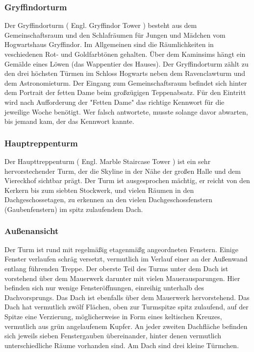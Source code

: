 \documentclass[a4paper, 10pt]{article}
\begin{document}
\subsubsection*{\large Gryffindorturm}
Der Gryffindorturm (  Engl.  Gryffindor Tower ) besteht aus dem Gemeinschaftsraum und den Schlafräumen für Jungen und Mädchen vom Hogwartshaus Gryffindor.
\vspace{10pt}
\newline
Im Allgemeinen sind die Räumlichkeiten in veschiedenen Rot- und Goldfarbtönen gehalten. Über dem Kaminsims hängt ein Gemälde eines Löwen (das Wappentier des Hauses). Der Gryffindorturm zählt zu den drei höchsten Türmen im Schloss Hogwarts neben dem Ravenclawturm und dem Astronomieturm.
\vspace{10pt}
\newline
Der Eingang zum Gemeinschaftsraum befindet sich hinter dem Portrait der fetten Dame beim großzügigen Teppenabsatz. Für den Eintritt wird nach Aufforderung der "Fetten Dame" das richtige Kennwort für die jeweilige Woche benötigt. Wer falsch antwortete, musste solange davor abwarten, bis jemand kam, der das Kennwort kannte.
\subsubsection*{\large Hauptreppenturm}
Der Haupttreppenturm (  Engl.  Marble Staircase Tower ) ist ein sehr hervorstechender Turm, der die Skyline in der Nähe der großen Halle und dem Viereckhof sichtbar prägt. Der Turm ist ausgesprochen mächtig, er reicht von den Kerkern bis zum siebten Stockwerk, und vielen Räumen in den Dachgeschossetagen, zu erkennen an den vielen Dachgeschossfenstern (Gaubenfenstern) im spitz zulaufendem Dach.
\subsubsection*{\large Außenansicht}
Der Turm ist rund mit regelmäßig etagenmäßg angeordneten Fenstern. Einige Fenster verlaufen schräg versetzt, vermutlich im Verlauf einer an der Außenwand entlang führenden Treppe. Der oberste Teil des Turms unter dem Dach ist vorstehend über dem Mauerwerk darunter mit vielen Mauerausparungen. Hier befinden sich nur wenige Fensteröffnungen, einreihig unterhalb des Dachvorsprungs. Das Dach ist ebenfalls über dem Mauerwerk hervorstehend. Das Dach hat vermutlich zwölf Flächen, oben zur Turmspitze spitz zulaufend, auf der Spitze eine Verzierung, möglicherweise in Form eines keltischen Kreuzes, vermutlich aus grün angelaufenem Kupfer.
\vspace{10pt}
\newline
An jeder zweiten Dachfläche befinden sich jeweils sieben Fenstergauben übereinander, hinter denen vermutlich unterschiedliche Räume vorhanden sind. Am Dach sind drei kleine Türmchen.
\end{document}

